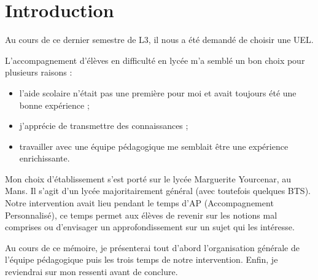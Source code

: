 \section{Introduction}

Au cours de ce dernier semestre de L3, il nous a été demandé de choisir une UEL.

L'accompagnement d'élèves en difficulté en lycée m'a semblé un bon choix pour plusieurs raisons :

\begin{itemize}
    \item l'aide scolaire n'était pas une première pour moi et avait toujours été une bonne expérience ;
    \item j'apprécie de transmettre des connaissances ;
    \item travailler avec une équipe pédagogique me semblait être une expérience enrichissante.
\end{itemize}

Mon choix d'établissement s'est porté sur le lycée Marguerite Yourcenar, au Mans. Il s'agit d'un lycée majoritairement général
(avec toutefois quelques BTS). Notre intervention avait lieu pendant le temps d'AP (Accompagnement Personnalisé), ce
temps permet aux élèves de revenir sur les notions mal comprises ou d'envisager un approfondissement sur un sujet qui
les intéresse.

Au cours de ce mémoire, je présenterai tout d'abord l'organisation générale de l'équipe pédagogique puis les trois
temps de notre intervention. Enfin, je reviendrai sur mon ressenti avant de conclure.
